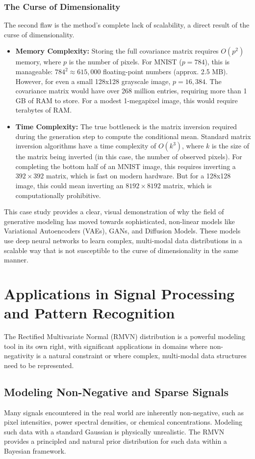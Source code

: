 \subsubsection{The Curse of Dimensionality}
The second flaw is the method's complete lack of scalability, a direct result of the curse of dimensionality.
\begin{itemize}
    \item \textbf{Memory Complexity:} Storing the full covariance matrix requires $O(p^2)$ memory, where $p$ is the number of pixels. For MNIST ($p=784$), this is manageable: $784^2 \approx 615,000$ floating-point numbers (approx. 2.5 MB). However, for even a small 128x128 grayscale image, $p=16,384$. The covariance matrix would have over 268 million entries, requiring more than 1 GB of RAM to store. For a modest 1-megapixel image, this would require terabytes of RAM.
    \item \textbf{Time Complexity:} The true bottleneck is the matrix inversion required during the generation step to compute the conditional mean. Standard matrix inversion algorithms have a time complexity of $O(k^3)$, where $k$ is the size of the matrix being inverted (in this case, the number of observed pixels). For completing the bottom half of an MNIST image, this requires inverting a $392 \times 392$ matrix, which is fast on modern hardware. But for a 128x128 image, this could mean inverting an $8192 \times 8192$ matrix, which is computationally prohibitive.
\end{itemize}
This case study provides a clear, visual demonstration of why the field of generative modeling has moved towards sophisticated, non-linear models like Variational Autoencoders (VAEs), GANs, and Diffusion Models. These models use deep neural networks to learn complex, multi-modal data distributions in a scalable way that is not susceptible to the curse of dimensionality in the same manner.

\section{Applications in Signal Processing and Pattern Recognition}
\label{sec:signal_processing_apps}

The Rectified Multivariate Normal (RMVN) distribution is a powerful modeling tool in its own right, with significant applications in domains where non-negativity is a natural constraint or where complex, multi-modal data structures need to be represented.

\subsection{Modeling Non-Negative and Sparse Signals}
Many signals encountered in the real world are inherently non-negative, such as pixel intensities, power spectral densities, or chemical concentrations. Modeling such data with a standard Gaussian is physically unrealistic. The RMVN provides a principled and natural prior distribution for such data within a Bayesian framework.

